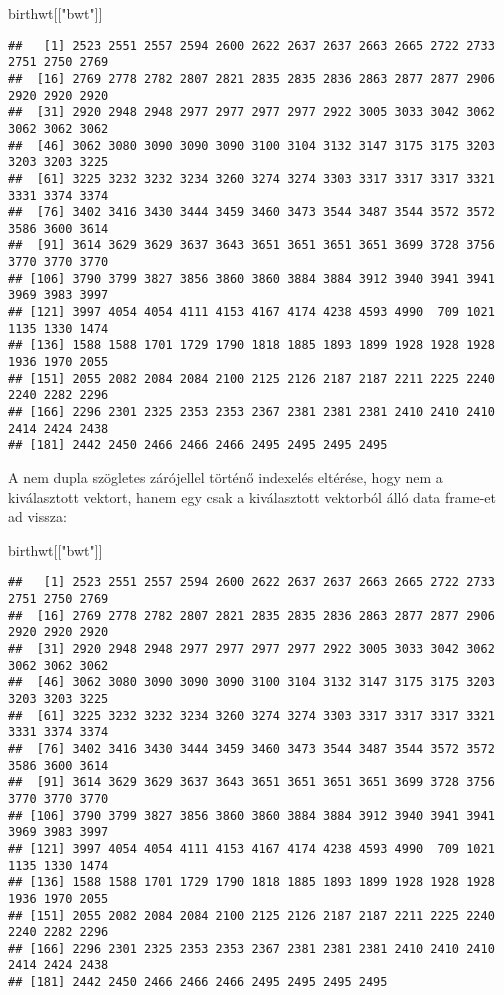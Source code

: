 \documentclass[
]{book}
\newenvironment{Shaded}{\begin{snugshade}}{\end{snugshade}}
\newcommand{\NormalTok}[1]{#1}
\newcommand{\StringTok}[1]{\textcolor[rgb]{0.31,0.60,0.02}{#1}}
\begin{document}
\begin{Shaded}
\begin{Highlighting}[]
\NormalTok{birthwt[[}\StringTok{"bwt"}\NormalTok{]]}
\end{Highlighting}
\end{Shaded}

\begin{verbatim}
##   [1] 2523 2551 2557 2594 2600 2622 2637 2637 2663 2665 2722 2733 2751 2750 2769
##  [16] 2769 2778 2782 2807 2821 2835 2835 2836 2863 2877 2877 2906 2920 2920 2920
##  [31] 2920 2948 2948 2977 2977 2977 2977 2922 3005 3033 3042 3062 3062 3062 3062
##  [46] 3062 3080 3090 3090 3090 3100 3104 3132 3147 3175 3175 3203 3203 3203 3225
##  [61] 3225 3232 3232 3234 3260 3274 3274 3303 3317 3317 3317 3321 3331 3374 3374
##  [76] 3402 3416 3430 3444 3459 3460 3473 3544 3487 3544 3572 3572 3586 3600 3614
##  [91] 3614 3629 3629 3637 3643 3651 3651 3651 3651 3699 3728 3756 3770 3770 3770
## [106] 3790 3799 3827 3856 3860 3860 3884 3884 3912 3940 3941 3941 3969 3983 3997
## [121] 3997 4054 4054 4111 4153 4167 4174 4238 4593 4990  709 1021 1135 1330 1474
## [136] 1588 1588 1701 1729 1790 1818 1885 1893 1899 1928 1928 1928 1936 1970 2055
## [151] 2055 2082 2084 2084 2100 2125 2126 2187 2187 2211 2225 2240 2240 2282 2296
## [166] 2296 2301 2325 2353 2353 2367 2381 2381 2381 2410 2410 2410 2414 2424 2438
## [181] 2442 2450 2466 2466 2466 2495 2495 2495 2495
\end{verbatim}

A nem dupla szögletes zárójellel történő indexelés eltérése, hogy nem a kiválasztott vektort, hanem egy csak a kiválasztott vektorból álló data frame-et ad vissza:

\begin{Shaded}
\begin{Highlighting}[]
\NormalTok{birthwt[[}\StringTok{"bwt"}\NormalTok{]]}
\end{Highlighting}
\end{Shaded}

\begin{verbatim}
##   [1] 2523 2551 2557 2594 2600 2622 2637 2637 2663 2665 2722 2733 2751 2750 2769
##  [16] 2769 2778 2782 2807 2821 2835 2835 2836 2863 2877 2877 2906 2920 2920 2920
##  [31] 2920 2948 2948 2977 2977 2977 2977 2922 3005 3033 3042 3062 3062 3062 3062
##  [46] 3062 3080 3090 3090 3090 3100 3104 3132 3147 3175 3175 3203 3203 3203 3225
##  [61] 3225 3232 3232 3234 3260 3274 3274 3303 3317 3317 3317 3321 3331 3374 3374
##  [76] 3402 3416 3430 3444 3459 3460 3473 3544 3487 3544 3572 3572 3586 3600 3614
##  [91] 3614 3629 3629 3637 3643 3651 3651 3651 3651 3699 3728 3756 3770 3770 3770
## [106] 3790 3799 3827 3856 3860 3860 3884 3884 3912 3940 3941 3941 3969 3983 3997
## [121] 3997 4054 4054 4111 4153 4167 4174 4238 4593 4990  709 1021 1135 1330 1474
## [136] 1588 1588 1701 1729 1790 1818 1885 1893 1899 1928 1928 1928 1936 1970 2055
## [151] 2055 2082 2084 2084 2100 2125 2126 2187 2187 2211 2225 2240 2240 2282 2296
## [166] 2296 2301 2325 2353 2353 2367 2381 2381 2381 2410 2410 2410 2414 2424 2438
## [181] 2442 2450 2466 2466 2466 2495 2495 2495 2495
\end{verbatim}
\end{document}
